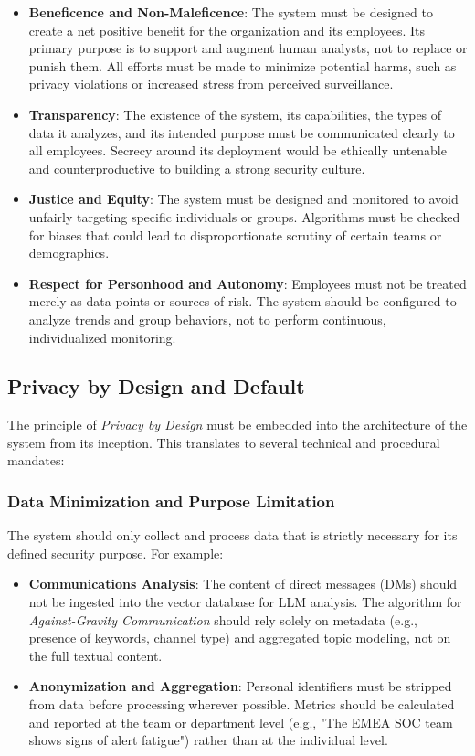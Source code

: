 \documentclass[11pt, a4paper]{article}
\begin{document}
\begin{itemize}
    \item \textbf{Beneficence and Non-Maleficence}: The system must be designed to create a net positive benefit for the organization and its employees. Its primary purpose is to support and augment human analysts, not to replace or punish them. All efforts must be made to minimize potential harms, such as privacy violations or increased stress from perceived surveillance.
    \item \textbf{Transparency}: The existence of the system, its capabilities, the types of data it analyzes, and its intended purpose must be communicated clearly to all employees. Secrecy around its deployment would be ethically untenable and counterproductive to building a strong security culture.
    \item \textbf{Justice and Equity}: The system must be designed and monitored to avoid unfairly targeting specific individuals or groups. Algorithms must be checked for biases that could lead to disproportionate scrutiny of certain teams or demographics.
    \item \textbf{Respect for Personhood and Autonomy}: Employees must not be treated merely as data points or sources of risk. The system should be configured to analyze trends and group behaviors, not to perform continuous, individualized monitoring.
\end{itemize}

\subsection{Privacy by Design and Default}
The principle of \textit{Privacy by Design} must be embedded into the architecture of the system from its inception. This translates to several technical and procedural mandates:

\subsubsection{Data Minimization and Purpose Limitation}
The system should only collect and process data that is strictly necessary for its defined security purpose. For example:
\begin{itemize}
    \item \textbf{Communications Analysis}: The content of direct messages (DMs) should not be ingested into the vector database for LLM analysis. The algorithm for \textit{Against-Gravity Communication} should rely solely on metadata (e.g., presence of keywords, channel type) and aggregated topic modeling, not on the full textual content.
    \item \textbf{Anonymization and Aggregation}: Personal identifiers must be stripped from data before processing wherever possible. Metrics should be calculated and reported at the team or department level (e.g., "The EMEA SOC team shows signs of alert fatigue") rather than at the individual level.
\end{itemize}
\end{document}
